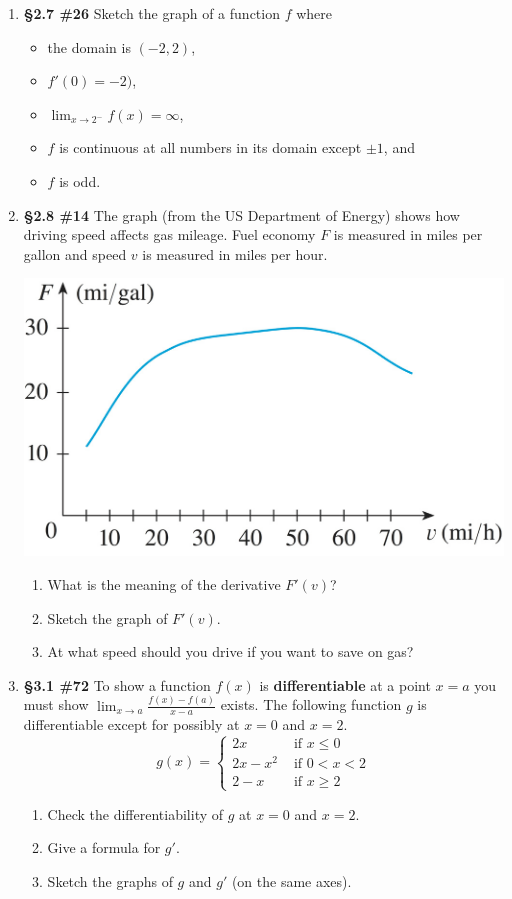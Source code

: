 \documentclass[%
]{article}
\begin{document}
\begin{enumerate}
\item {\bf \S2.7 \#26} Sketch the graph of a function $f$ where 
	\begin{itemize}
	\item the domain is $(-2,2)$, 
	\item $f'(0)=-2)$, 
	\item $\lim_{x\to 2^-}f(x)=\infty$,
	\item $f$ is continuous at all numbers in its domain except $\pm 1$, and
	\item $f$ is odd.
	\end{itemize}

\item {\bf \S2.8 \#14} The graph (from the US Department of Energy) shows how driving speed affects gas mileage.  Fuel economy $F$ is measured in miles per gallon and speed $v$ is measured in miles per hour.
\begin{center}
\includegraphics[scale=5]{2-8_12Stewart8Ed.jpg}
\end{center}
	\begin{enumerate}
	\item What is the meaning of the derivative $F'(v)$?
	\item Sketch the graph of $F'(v)$.
	\item At what speed should you drive if you want to save on gas?
	\end{enumerate}

\newpage
\item {\bf \S3.1 \#72} To show a function $f(x)$ is \textbf{differentiable} at a point $x=a$ you must show $\displaystyle\lim_{x\to a}\frac{f(x)-f(a)}{x-a}$ exists.  The following function $g$ is differentiable except for possibly at $x=0$ and $x=2$.
\[
g(x)=\begin{cases}
	2x & \text{ if } x\leq 0 \\
	2x-x^2 & \text{ if } 0<x<2 \\
	2-x & \text{ if } x\geq 2
	\end{cases}
\] 
	\begin{enumerate}
	\item Check the differentiability of $g$ at $x=0$ and $x=2$.  
	\item Give a formula for $g'$.
	\item Sketch the graphs of $g$ and $g'$ (on the same axes).
	\end{enumerate}


\end{enumerate}
\end{document}
